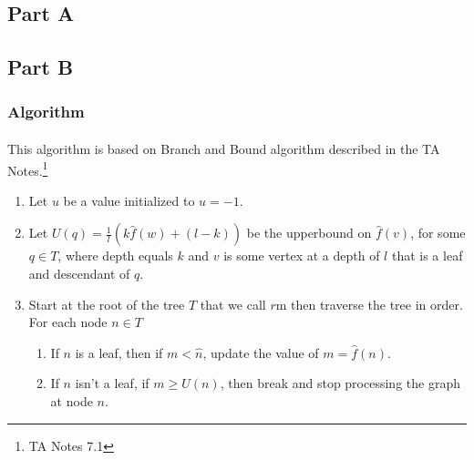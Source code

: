 \documentclass{article}
\begin{document}
\subsection{Part A}


\subsection{Part B}
\subsubsection{Algorithm}
\paragraph{}
This algorithm is based on Branch and Bound algorithm described in the TA
Notes.\footnote{TA Notes 7.1}

\begin{enumerate}
      \item Let \(u\) be a value initialized to \(u = -1\).
      \item Let \(U(q) = \frac{1}{l} (k \hat{f}(w) + (l - k)) \) be the upperbound on
            \(\hat{f}(v)\), for some \(q \in T\), where depth equals \(k\) and \(v\) is
            some vertex at a depth of \(l\) that is a leaf and descendant of \(q\).
      \item Start at the root of the tree \(T\) that we call \(r\)m then traverse the tree
            in order. For each node \(n \in T \) \begin{enumerate}
                  \item If \(n\) is a leaf, then if \(m < \hat{n} \), update the value of
                        \(m = \hat{f}(n) \).
                  \item If \(n\) isn't a leaf, if \(m \geq U(n) \), then break and stop
                        processing the graph at node \(n\).
            \end{enumerate}

\end{enumerate}
\end{document}
